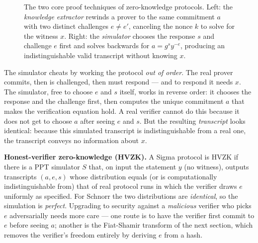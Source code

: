 \begin{figure}[H]
\caption{The two core proof techniques of zero-knowledge protocols. Left: the \emph{knowledge extractor} rewinds a prover to the same commitment $a$ with two distinct challenges $e \ne e'$, canceling the nonce $k$ to solve for the witness $x$. Right: the \emph{simulator} chooses the response $s$ and challenge $e$ first and solves backwards for $a = g^s y^{-e}$, producing an indistinguishable valid transcript without knowing $x$.}
\label{ch31:fig-rewinding-vs-sim}
\end{figure}

\begin{intuitionbox}
The simulator cheats by working the protocol \emph{out of order}. The real
prover commits, then is challenged, then must respond --- and to respond it needs
$x$. The simulator, free to choose $e$ and $s$ itself, works in reverse order:
it chooses the response and the challenge first, then computes the unique commitment $a$ that makes the verification equation hold. A
real verifier cannot do this because it does not get to choose $a$ after seeing
$e$ and $s$. But the resulting \emph{transcript} looks identical: because this simulated transcript is indistinguishable from a real one, the transcript conveys no
information about $x$.
\end{intuitionbox}

\begin{formalbox}
\textbf{Honest-verifier zero-knowledge (HVZK).} A Sigma protocol is HVZK if there is a
PPT simulator $S$ that, on input the statement $y$ (no witness), outputs
transcripts $(a,e,s)$ whose distribution equals (or is computationally
indistinguishable from) that of real protocol runs in which the verifier draws
$e$ uniformly as specified. For Schnorr the two distributions are
\emph{identical}, so the simulation is \emph{perfect}. Upgrading to security
against a \emph{malicious} verifier who picks $e$ adversarially needs more
care --- one route is to have the verifier first commit to $e$ before seeing
$a$; another is the Fiat-Shamir transform of the next section, which removes the
verifier's freedom entirely by deriving $e$ from a hash.
\end{formalbox}

